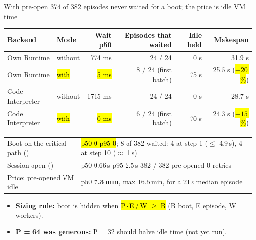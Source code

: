 \begin{frame}{With pre-open 374 of 382 episodes never waited for a boot; the price is idle VM time}
\scriptsize\setlength{\tabcolsep}{5pt}
\begin{tabularx}{\textwidth}{@{}Y l r r r r@{}}
\toprule
\textbf{Backend} & \textbf{Mode} & \textbf{Wait p50} & \textbf{Episodes that waited} & \textbf{Idle held} & \textbf{Makespan}\\
\midrule
Own Runtime & without & 774 ms & 24 / 24 & 0 s & 31.9 s\\
Own Runtime & \hl{with} & \hl{5 ms} & 8 / 24 (first batch) & 75 s & 25.5 s (\hl{$-20$\,\%})\\
Code Interpreter & without & 1715 ms & 24 / 24 & 0 s & 28.7 s\\
Code Interpreter & \hl{with} & \hl{0 ms} & 6 / 24 (first batch) & 70 s & 24.3 s (\hl{$-15$\,\%})\\
\bottomrule
\end{tabularx}
\par\vspace{1.5mm}
\scriptsize
\begin{tabularx}{\textwidth}{@{}P{0.36\textwidth}Y@{}}
\toprule
Boot on the critical path () & \hl{p50 0 \textperiodcentered{} p95 0}; 8 of 382 waited: 4 at step 1 ($\le$ 4.9\,s), 4 at step 10 ($\approx$ 1\,s)\\
Session open () & p50 0.66\,s \textperiodcentered{} p95 2.5\,s \textperiodcentered{} 382 / 382 pre-opened \textperiodcentered{} 0 retries\\
Price: pre-opened VM idle & p50 \textbf{7.3\,min}, max 16.5\,min, for a 21\,s median episode\\
\bottomrule
\end{tabularx}
\par\vspace{1.5mm}
\begin{itemize}\scriptsize\setlength{\itemsep}{0.5mm}
\item \textbf{Sizing rule:} boot is hidden when \hl{P\,$\cdot$\,E\,/\,W $\ge$ B} (B boot, E episode, W workers).
\item \textbf{P = 64 was generous:} P = 32 should halve idle time (not yet run).
\end{itemize}
\end{frame}

